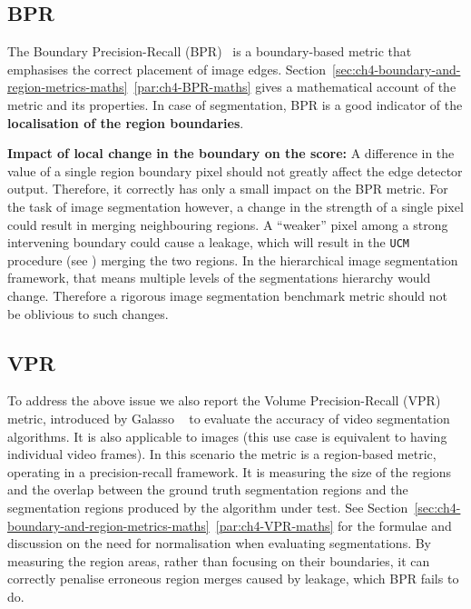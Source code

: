 \subsection{BPR}
\label{sec:ch5-BPR-evaluation-metric}
The Boundary Precision-Recall (BPR)~\cite{Arbelaez11} is a boundary-based metric that emphasises the correct placement of image edges. Section~\ref*{sec:ch4-boundary-and-region-metrics-maths}~\ref{par:ch4-BPR-maths} %
gives a mathematical account of %
the metric and its properties. In case of segmentation, BPR is a good indicator of the {\bf localisation of the region boundaries}.

\textbf{Impact of %
local change in the boundary on the score:} A difference in the value of a single region boundary pixel should not greatly affect the edge detector output. Therefore, it correctly has only a small impact on the BPR metric. For the task of image segmentation however, a change in the strength of a single pixel could result in merging neighbouring regions. A ``weaker'' pixel among a strong intervening boundary could cause %
a leakage, which will result in %
the {\tt UCM} procedure %
(see %
) %
merging the two regions. In the hierarchical image segmentation framework, that means multiple levels of the segmentations hierarchy would change. Therefore a rigorous image segmentation benchmark metric should not be oblivious to such changes.

\subsection{VPR}
To address the above issue we also report the Volume Precision-Recall (VPR) metric, introduced by Galasso \etal~\cite{Galasso13} to evaluate the accuracy of video segmentation algorithms. It is also applicable to images (this use case is equivalent to having individual video frames). In this scenario the metric is a region-based metric, operating %
in %
a precision-recall framework. It is measuring the size of the regions and the overlap between the ground truth segmentation regions and the segmentation regions produced by the algorithm under test. 
See Section~\ref*{sec:ch4-boundary-and-region-metrics-maths}~\ref{par:ch4-VPR-maths} for the formulae and discussion on the need for normalisation when evaluating segmentations. By measuring the region areas, rather than focusing on their boundaries, it can correctly penalise erroneous region merges caused by leakage, which BPR fails to do.

